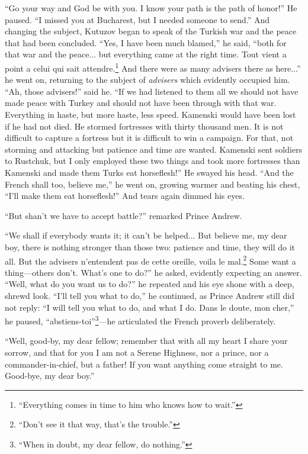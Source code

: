 ``Go your way and God be with you. I know your path is the path
of honor!'' He paused. ``I missed you at Bucharest, but I needed
someone to send.'' And changing the subject, Kutuzov began to
speak of the Turkish war and the peace that had been
concluded. ``Yes, I have been much blamed,'' he said, ``both for
that war and the peace... but everything came at the right
time. Tout vient a point a celui qui sait
attendre.\footnote{``Everything comes in time to him who knows
how to wait.''}  And there were as many advisers there as
here...'' he went on, returning to the subject of \emph{advisers}
which evidently occupied him. ``Ah, those advisers!'' said
he. ``If we had listened to them all we should not have made
peace with Turkey and should not have been through with that war.
Everything in haste, but more haste, less speed. Kamenski would
have been lost if he had not died. He stormed fortresses with
thirty thousand men. It is not difficult to capture a fortress
but it is difficult to win a campaign. For that, not storming and
attacking but patience and time are wanted. Kamenski sent
soldiers to Rustchuk, but I only employed these two things and
took more fortresses than Kamenski and made them Turks eat
horseflesh!'' He swayed his head. ``And the French shall too,
believe me,'' he went on, growing warmer and beating his chest,
``I'll make them eat horseflesh!'' And tears again dimmed his
eyes.

``But shan't we have to accept battle?'' remarked Prince Andrew.

``We shall if everybody wants it; it can't be helped... But
believe me, my dear boy, there is nothing stronger than those
two: patience and time, they will do it all. But the advisers
n'entendent pas de cette oreille, voila le mal.\footnote{``Don't
see it that way, that's the trouble.''} Some want a
thing---others don't. What's one to do?'' he asked, evidently
expecting an answer. ``Well, what do you want us to do?'' he
repeated and his eye shone with a deep, shrewd look. ``I'll tell
you what to do,'' he continued, as Prince Andrew still did not
reply: ``I will tell you what to do, and what I do. Dans le
doute, mon cher,'' he paused, ``abstiens-toi''\footnote{``When in
doubt, my dear fellow, do nothing.''}---he articulated the French
proverb deliberately.

``Well, good-by, my dear fellow; remember that with all my heart
I share your sorrow, and that for you I am not a Serene Highness,
nor a prince, nor a commander-in-chief, but a father! If you want
anything come straight to me. Good-bye, my dear boy.''

